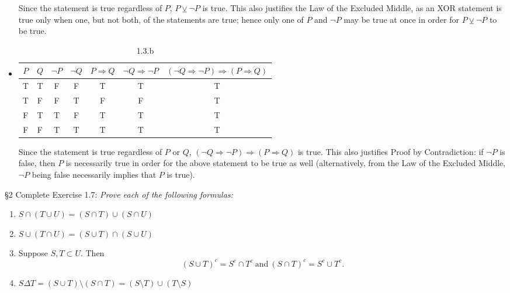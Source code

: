 \documentclass{homework}
\begin{document}
\begin{solution}
\begin{itemize}
\begin{table}[htpb]
\begin{tabular}{c|c|c}
        \end{tabular}
      \end{table}
      Since the statement is true regardless of $P$, $P \veebar \neg P$ is true. This also
      justifies the Law of the Excluded Middle, as an XOR statement is true only when one, but
      not both, of the statements are true; hence only one of $P$ and $\neg P$ may be true at
      once in order for $P \veebar \neg P$ to be true.
    \item 
      \begin{table}[htpb]
        \centering
        \caption{1.3.b}
        \begin{tabular}{c|c|c|c|c|c|c}
          $P$ & $Q$ & $\neg P$ &  $\neg Q$ & $P\Rightarrow Q$ & $\neg Q \Rightarrow \neg P$ & 
          $\left( \neg Q \Rightarrow \neg P \right) \Rightarrow \left( P\Rightarrow Q \right) $\\
          \toprule \bottomrule
          T & T & F & F & T & T & T\\
          T & F & F & T & F & F & T\\
          F & T & T & F & T & T & T\\
          F & F & T & T & T & T & T
        \end{tabular}
      \end{table}
      Since the statement is true regardless of $P$ or $Q$, $\left( \neg Q \Rightarrow \neg P
      \right) \Rightarrow \left( P\Rightarrow Q \right)$ is true. This also justifies Proof by
      Contradiction: if $\neg P$ is false, then $P$ is necessarily true in order for
      the above statement to be true as well (alternatively, from the Law of the Excluded Middle,
      $\neg P$ being false necessarily implies that $P$ is true).
  \end{itemize}
\end{solution}

\begin{problem}{\S 2}
  Complete Exercise 1.7: \textit{Prove each of the following formulas:} 
  \begin{enumerate}[label=(\alph*)]
    \item $S\cap \left( T \cup U \right) = \left( S\cap T \right) \cup \left( S\cap U \right)$
    \item $S\cup \left( T\cap U \right) = \left( S\cup T \right) \cap \left( S\cup U \right)$
    \item Suppose $S, T\subset U$. Then \[
        \left( S\cup T \right) ^{c} = S^{c}\cap T^{c} ~\text{and}~ \left( S\cap T \right) ^{c}
        =S^{c}\cup T^{c}
      .\] 
    \item $S\Delta T = \left( S\cup T \right) \setminus \left( S\cap T \right) = \left( S\setminus
      T\right) \cup \left( T\setminus S \right) $
  \end{enumerate}
\end{problem}
\end{document}
